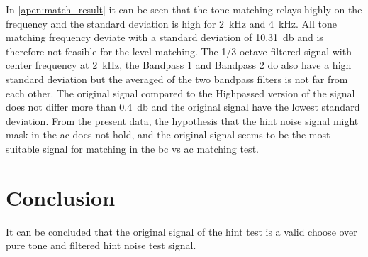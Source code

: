 In \autoref{apen:match_result} it can be seen that the tone matching relays highly on the frequency and the standard deviation is high for \SI{2}{\kilo\hertz}  and \SI{4}{\kilo\hertz}. All tone matching frequency deviate with a standard deviation of \SI{10.31}{\decibel} and is therefore not feasible for the level matching. The 1/3 octave filtered signal with center frequency at \SI{2}{\kilo\hertz}, the Bandpass 1 and Bandpass 2 do also have a high standard deviation but the averaged of the two bandpass filters is not far from each other. The original signal compared to the Highpassed version of the signal does not differ more than \SI{0.4}{\decibel} and the original signal have the lowest standard deviation. From the present data, the hypothesis that the \gls{hint} noise signal might mask in the \gls{ac} does not hold, and the original signal seems to be the most suitable signal for matching in the \gls{bc} vs \gls{ac} matching test.

\section*{Conclusion}
It can be concluded that the original signal of the \gls{hint} test is a valid choose over pure tone and filtered \gls{hint} noise test signal.

